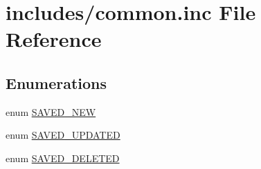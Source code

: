 \hypertarget{common_8inc}{
\section{includes/common.inc File Reference}
\label{common_8inc}
}
\subsection*{Enumerations}
\begin{CompactItemize}
\item 
enum \hyperlink{common_8inc_7d54df6ca81759341e08f451d4f6c8cd}{SAVED\_\-NEW} 
\item 
enum \hyperlink{common_8inc_7daf0b68ef3b54562e9999ef017e28cb}{SAVED\_\-UPDATED} 
\item 
enum \hyperlink{common_8inc_38f401ae5a8d3c2f0a06307fa001fff5}{SAVED\_\-DELETED} 
\end{CompactItemize}
